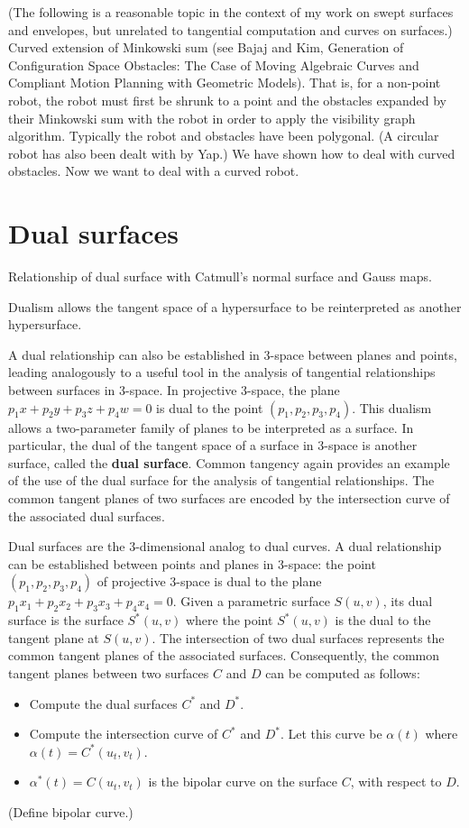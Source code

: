 \documentclass[11pt]{article}
\begin{document}
(The following is a reasonable topic in the context of my work on 
swept surfaces and envelopes, but unrelated to tangential computation
and curves on surfaces.)
Curved extension of Minkowski sum (see Bajaj and Kim, Generation of Configuration
Space Obstacles: The Case of Moving Algebraic Curves
and Compliant Motion Planning with Geometric Models).
That is, for a non-point robot, the robot must first be shrunk to a point
and the obstacles expanded by their Minkowski sum with the robot
in order to apply the visibility graph algorithm.
Typically the robot and obstacles have been polygonal.
(A circular robot has also been dealt with by Yap.)
We have shown how to deal with curved obstacles.
Now we want to deal with a curved robot.

\section{Dual surfaces}

Relationship of dual surface with Catmull's normal surface and Gauss maps.

Dualism allows the tangent space of a hypersurface to be reinterpreted
as another hypersurface.

A dual relationship can also be established in 3-space between planes and
points, leading analogously to a useful tool in the analysis of tangential relationships
between surfaces in 3-space.	
In projective 3-space, the plane $p_1x + p_2y + p_3z + p_4w = 0$ 
is dual to the point $(p_1,p_2,p_3,p_4)$.
This dualism allows a two-parameter family of planes to be interpreted as a
surface.
In particular, the dual of the tangent space of a surface in 3-space is 
another surface, called the {\bf dual surface}.
Common tangency again provides an example of the use of the dual 
surface for the analysis of tangential relationships.
The common tangent planes of two surfaces are encoded by the intersection
curve of the associated dual surfaces.

Dual surfaces are the 3-dimensional analog to dual curves.
A dual relationship can be established between points and planes in 3-space:
the point $(p_1,p_2,p_3,p_4)$ of projective 3-space
is dual to the plane $p_1x_1 + p_2x_2 + p_3x_3 + p_4x_4 = 0$.
Given a parametric surface $S(u,v)$, its dual surface is the surface $S^*(u,v)$
where the point $S^*(u,v)$ is the dual to the tangent plane at $S(u,v)$.
The intersection of two dual surfaces represents the common tangent planes
of the associated surfaces.
Consequently, the common tangent planes between two surfaces $C$ and $D$ can be
computed as follows:
\begin{itemize}
\item	Compute the dual surfaces $C^*$ and $D^*$.
\item 	Compute the intersection curve of $C^*$ and $D^*$.
	Let this curve be $\alpha(t)$ where $\alpha(t) = C^*(u_t,v_t)$.
\item	$\alpha^*(t) = C(u_t,v_t)$ is the bipolar curve on the surface $C$,
	with respect to $D$.
\end{itemize}
(Define bipolar curve.)
\end{document}

